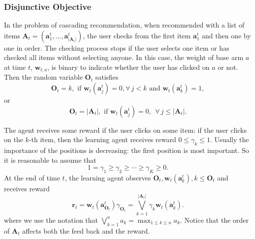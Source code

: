 \documentclass{article}
\newcommand{\bA}{\mathbf{A}}
\newcommand{\ba}{\mathbf{a}}
\newcommand{\bO}{\mathbf{O}}
\newcommand{\br}{\mathbf{r}}
\newcommand{\bw}{\mathbf{w}}
\newcommand{\abs}[1]{\left| #1 \right|}
\begin{document}
\subsubsection{Disjunctive Objective}

In the problem of cascading recommendation, when recommended with a list of items $\bA_t = (\ba_{1}^t,...,\ba_{\abs{\bA_t}}^t)$, the user checks from the first item $\ba_{1}^t$ and then one by one in order. The checking process stops if the user selects one item or has checked all items without selecting anyone. In this case, the weight of base arm $a$ at time $t$, $\bw_{t,a}$, is binary to indicate whether the user has clicked on $a$ or not. Then the random variable $\bO_t$ satisfies
$$
\bO_t = k, \text{ if } \bw_t(\ba_j^t)=0, \forall\, j < k \text{ and } \bw_t(\ba_k^t) = 1,
$$
or 
$$
\bO_t = \abs{\bA_t}, \text{ if }\bw_t(\ba_j^t) = 0, ~~ \forall\, j \leq \abs{\bA_t}.
$$

The agent receives some reward if the user clicks on some item: if the user clicks on the $k$-th item, then the learning agent receives reward $0 \leq \gamma_k \leq 1$. Usually the importance of the positions is decreasing: the first position is most important. So it is reasonable to assume that
$$
1 = \gamma_1 \geq \gamma_2 \geq \cdots \geq \gamma_K \geq 0.
$$
At the end of time $t$, the learning agent observes $\bO_t, \bw_t(\ba_k^t), k \leq \bO_t$ and receives reward
$$
\br_t = \bw_t(\ba_{\bO_t}^t) \gamma_{\bO_t} = \bigvee_{k=1}^{\abs{\bA_t}} \gamma_k \bw_t(\ba_k^t).
$$
where we use the notation that $\bigvee_{k=1}^n a_k = \max_{1 \leq k \leq n} a_k$. Notice that the order of $\bA_t$ affects both the feed back and the reward.
\end{document}
